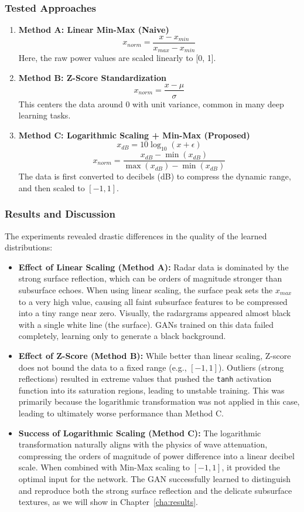 \subsubsection{Tested Approaches}
\begin{enumerate}
    \item \textbf{Method A: Linear Min-Max (Naive)}
    $$ x_{norm} = \frac{x - x_{min}}{x_{max} - x_{min}} $$
    Here, the raw power values are scaled linearly to [0, 1].
    
    \item \textbf{Method B: Z-Score Standardization}
    $$ x_{norm} = \frac{x - \mu}{\sigma} $$
    This centers the data around 0 with unit variance, common in many deep learning tasks.
    
    \item \textbf{Method C: Logarithmic Scaling + Min-Max (Proposed)}
    $$ x_{dB} = 10 \log_{10}(x + \epsilon) $$
    $$ x_{norm} = \frac{x_{dB} - \min(x_{dB})}{\max(x_{dB}) - \min(x_{dB})} $$
    The data is first converted to decibels (dB) to compress the dynamic range, and then scaled to $[-1, 1]$.
\end{enumerate}

\subsubsection{Results and Discussion}
The experiments revealed drastic differences in the quality of the learned distributions:

\begin{itemize}
    \item \textbf{Effect of Linear Scaling (Method A):} Radar data is dominated by the strong surface reflection, which can be orders of magnitude stronger than subsurface echoes. When using linear scaling, the surface peak sets the $x_{max}$ to a very high value, causing all faint subsurface features to be compressed into a tiny range near zero. Visually, the radargrams appeared almost black with a single white line (the surface). GANs trained on this data failed completely, learning only to generate a black background.
    \item \textbf{Effect of Z-Score (Method B):} While better than linear scaling, Z-score does not bound the data to a fixed range (e.g., $[-1, 1]$). Outliers (strong reflections) resulted in extreme values that pushed the \texttt{tanh} activation function into its saturation regions, leading to unstable training. This was primarily because the logarithmic transformation was not applied in this case, leading to ultimately worse performance than Method C.
    \item \textbf{Success of Logarithmic Scaling (Method C):} The logarithmic transformation naturally aligns with the physics of wave attenuation, compressing the orders of magnitude of power difference into a linear decibel scale. When combined with Min-Max scaling to $[-1, 1]$, it provided the optimal input for the network. The GAN successfully learned to distinguish and reproduce both the strong surface reflection and the delicate subsurface textures, as we will show in Chapter~\ref{cha:results}.
\end{itemize}

